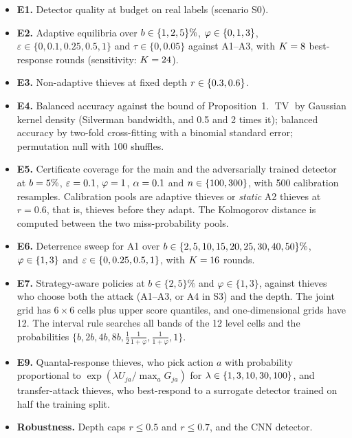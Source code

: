 \documentclass[11pt]{article}
\DeclareMathOperator{\TV}{TV}
\begin{document}
\begin{itemize}
\item \textbf{E1.} Detector quality at budget on real labels (scenario S0).
\item \textbf{E2.} Adaptive equilibria over $b\in\{1, 2, 5\}\%$, $\varphi\in\{0, 1, 3\}$, $\varepsilon\in\{0,0.1,0.25,0.5,1\}$ and $\tau\in\{0,0.05\}$ against A1--A3, with $K=8$ best-response rounds (sensitivity: $K=24$).
\item \textbf{E3.} Non-adaptive thieves at fixed depth $r\in\{0.3,0.6\}$.
\item \textbf{E4.} Balanced accuracy against the bound of Proposition~1. $\TV$ by Gaussian kernel density (Silverman bandwidth, and 0.5 and 2 times it); balanced accuracy by two-fold cross-fitting with a binomial standard error; permutation null with 100 shuffles.
\item \textbf{E5.} Certificate coverage for the main and the adversarially trained detector at $b=5\%$, $\varepsilon=0.1$, $\varphi=1$, $\alpha=0.1$ and $n\in\{100, 300\}$, with 500 calibration resamples. Calibration pools are adaptive thieves or \emph{static} A2 thieves at $r=0.6$, that is, thieves before they adapt. The Kolmogorov distance is computed between the two miss-probability pools.
\item \textbf{E6.} Deterrence sweep for A1 over $b\in\{2, 5, 10, 15, 20, 25, 30, 40, 50\}\%$, $\varphi\in\{1, 3\}$ and $\varepsilon\in\{0, 0.25, 0.5, 1\}$, with $K=16$ rounds.
\item \textbf{E7.} Strategy-aware policies at $b\in\{2,5\}\%$ and $\varphi\in\{1,3\}$, against thieves who choose both the attack (A1--A3, or A4 in S3) and the depth. The joint grid has $6\times6$ cells plus upper score quantiles, and one-dimensional grids have 12. The interval rule searches all bands of the 12 level cells and the probabilities $\{b,2b,4b,8b,\tfrac12\tfrac1{1+\varphi},\tfrac1{1+\varphi},1\}$.
\item \textbf{E9.} Quantal-response thieves, who pick action $a$ with probability proportional to $\exp(\lambda U_{ja}/\max_a G_{ja})$ for $\lambda\in\{1, 3, 10, 30, 100\}$, and transfer-attack thieves, who best-respond to a surrogate detector trained on half the training split.
\item \textbf{Robustness.} Depth caps $r\le0.5$ and $r\le0.7$, and the CNN detector.
\end{itemize}
\end{document}
